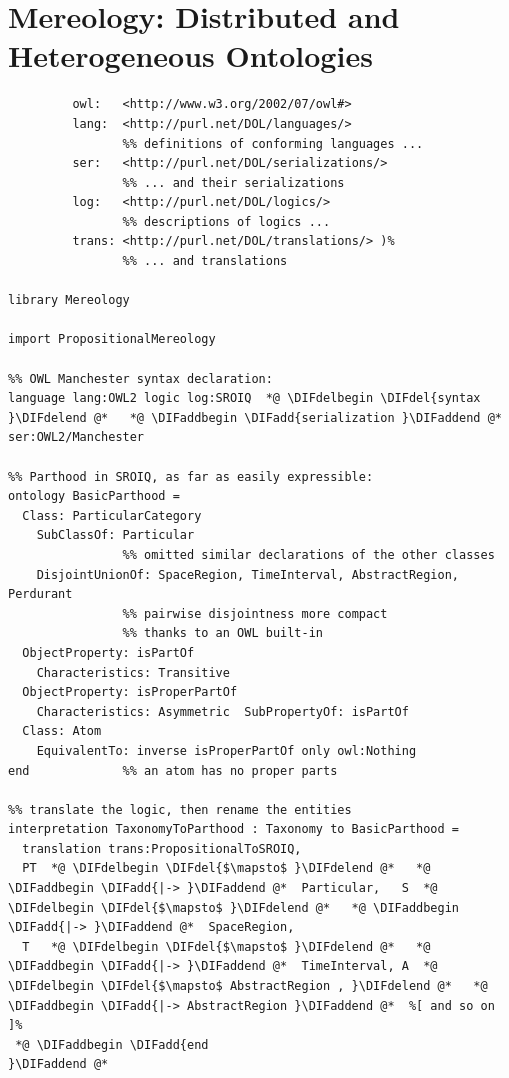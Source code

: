 \documentclass[10pt,fleqn,final]{scrreprt}
\newcommand{\sclause}[1]{\section{#1}}
\providecommand{\DIFadd}[1]{{\protect\color{blue}\uwave{#1}}} %
\providecommand{\DIFdel}[1]{{\protect\color{red}\sout{#1}}}                      %
\providecommand{\DIFaddbegin}{} %
\providecommand{\DIFaddend}{} %
\providecommand{\DIFdelbegin}{} %
\providecommand{\DIFdelend}{} %
\begin{document}
\sclause{Mereology: Distributed and Heterogeneous Ontologies}
\label{dist-het-onto}
\begin{lstlisting}[basicstyle=\ttfamily,language=dolText,alsolanguage=owl2Manchester,alsolanguage=clif,escapechar=@,mathescape]
%prefix( :      <http://www.example.org/mereology#>
         owl:   <http://www.w3.org/2002/07/owl#>
         lang:  <http://purl.net/DOL/languages/>
                %% definitions of conforming languages ...
         ser:   <http://purl.net/DOL/serializations/>
                %% ... and their serializations
         log:   <http://purl.net/DOL/logics/>
                %% descriptions of logics ...
         trans: <http://purl.net/DOL/translations/> )%
                %% ... and translations

library Mereology

import PropositionalMereology

%% OWL Manchester syntax declaration: 
language lang:OWL2 logic log:SROIQ  *@ \DIFdelbegin \DIFdel{syntax }\DIFdelend @*   *@ \DIFaddbegin \DIFadd{serialization }\DIFaddend @*  ser:OWL2/Manchester           

%% Parthood in SROIQ, as far as easily expressible:
ontology BasicParthood =                             
  Class: ParticularCategory 
  	SubClassOf: Particular
                %% omitted similar declarations of the other classes
    DisjointUnionOf: SpaceRegion, TimeInterval, AbstractRegion, Perdurant
                %% pairwise disjointness more compact 
                %% thanks to an OWL built-in
  ObjectProperty: isPartOf        
  	Characteristics: Transitive
  ObjectProperty: isProperPartOf  
  	Characteristics: Asymmetric  SubPropertyOf: isPartOf 
  Class: Atom 
  	EquivalentTo: inverse isProperPartOf only owl:Nothing
end             %% an atom has no proper parts

%% translate the logic, then rename the entities
interpretation TaxonomyToParthood : Taxonomy to BasicParthood =
  translation trans:PropositionalToSROIQ,
  PT  *@ \DIFdelbegin \DIFdel{$\mapsto$ }\DIFdelend @*   *@ \DIFaddbegin \DIFadd{|-> }\DIFaddend @*  Particular,   S  *@ \DIFdelbegin \DIFdel{$\mapsto$ }\DIFdelend @*   *@ \DIFaddbegin \DIFadd{|-> }\DIFaddend @*  SpaceRegion,
  T   *@ \DIFdelbegin \DIFdel{$\mapsto$ }\DIFdelend @*   *@ \DIFaddbegin \DIFadd{|-> }\DIFaddend @*  TimeInterval, A  *@ \DIFdelbegin \DIFdel{$\mapsto$ AbstractRegion , }\DIFdelend @*   *@ \DIFaddbegin \DIFadd{|-> AbstractRegion }\DIFaddend @*  %[ and so on ]%
 *@ \DIFaddbegin \DIFadd{end
}\DIFaddend @*  


\end{lstlisting}
\end{document}
